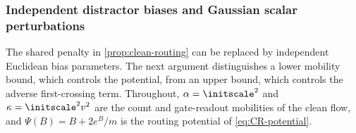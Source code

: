 \subsubsection{Independent distractor biases and Gaussian scalar perturbations}
\label{app:CR-independent}

The shared penalty in \cref{prop:clean-routing} can be replaced by independent Euclidean bias parameters.
The next argument distinguishes a lower mobility bound, which controls the potential,
from an upper bound, which controls the adverse first-crossing term.
Throughout, $\alpha=\initscale^2$ and $\kappa=\initscale^2v^2$ are the count and gate-readout mobilities of the clean flow, and
$\Psi(B)=B+2e^B/m$ is the routing potential of \cref{eq:CR-potential}.

